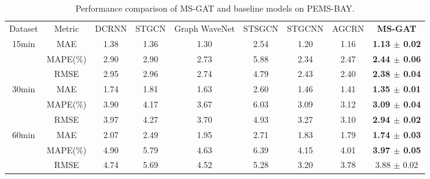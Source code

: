 \begin{table}[!htb]
    \caption{Performance comparison of MS-GAT and baseline models on PEMS-BAY.}
    \label{tab:pems-bay}
    \centering
    \begin{tabular}{ccccccccc}
        \toprule[2pt]
        \multirow{2}{*}{Dataset}                    &
        \multirow{2}{*}{Metric}                     &
        \multirow{2}{*}{DCRNN}                      &
        \multirow{2}{*}{STGCN}                      &
        \multirow{2}{*}{Graph WaveNet}              &
        \multirow{2}{*}{STSGCN}                     &
        \multirow{2}{*}{STGCNN}                     &
        \multirow{2}{*}{AGCRN}                     &
        \multirow{2}{*}{\textbf{MS-GAT}}                                                                                                        
        \\
        \\
        \hline
        \multicolumn{1}{c|}{\multirow{3}{*}{15min}} & \multicolumn{1}{c|}{MAE}      & 1.38 & 1.36 & 1.30 & 2.54 & 1.20 & 1.16 & \textbf{1.13 $\pm$ 0.02} \\
        \multicolumn{1}{c|}{}                       & \multicolumn{1}{c|}{MAPE(\%)} & 2.90 & 2.90 & 2.73 & 5.88 & 2.34 & 2.47 & \textbf{2.44 $\pm$ 0.06} \\
        \multicolumn{1}{c|}{}                       & \multicolumn{1}{c|}{RMSE}     & 2.95 & 2.96 & 2.74 & 4.79 & 2.43 & 2.40 & \textbf{2.38 $\pm$ 0.04} \\
        \hline
        \multicolumn{1}{c|}{\multirow{3}{*}{30min}} & \multicolumn{1}{c|}{MAE}      & 1.74 & 1.81 & 1.63 & 2.60 & 1.46 & 1.41 & \textbf{1.35 $\pm$ 0.01} \\
        \multicolumn{1}{c|}{}                       & \multicolumn{1}{c|}{MAPE(\%)} & 3.90 & 4.17 & 3.67 & 6.03 & 3.09 & 3.12 & \textbf{3.09 $\pm$ 0.04} \\
        \multicolumn{1}{c|}{}                       & \multicolumn{1}{c|}{RMSE}     & 3.97 & 4.27 & 3.70 & 4.93 & 3.27 & 3.10 & \textbf{2.94 $\pm$ 0.02} \\
        \hline
        \multicolumn{1}{c|}{\multirow{3}{*}{60min}} & \multicolumn{1}{c|}{MAE}      & 2.07 & 2.49 & 1.95 & 2.71 & 1.83 & 1.79 & \textbf{1.74 $\pm$ 0.03} \\
        \multicolumn{1}{c|}{}                       & \multicolumn{1}{c|}{MAPE(\%)} & 4.90 & 5.79 & 4.63 & 6.39 & 4.15 & 4.01 & \textbf{3.97 $\pm$ 0.05} \\
        \multicolumn{1}{c|}{}                       & \multicolumn{1}{c|}{RMSE}     & 4.74 & 5.69 & 4.52 & 5.28 & 3.20 & 3.78 & 3.88 $\pm$ 0.02          \\
        \bottomrule[2pt]
    \end{tabular}
\end{table}

